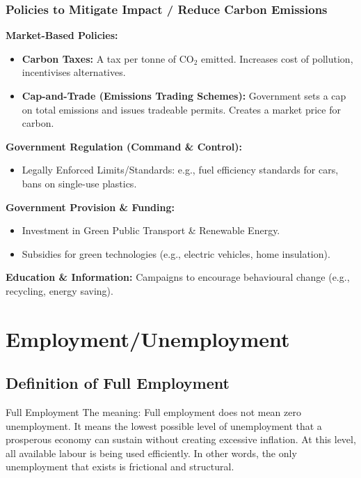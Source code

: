 \documentclass[11pt, a4paper, twoside]{book}
\begin{document}
\subsubsection{Policies to Mitigate Impact / Reduce Carbon Emissions}

\textbf{Market-Based Policies:}
\begin{itemize}
  \item \textbf{Carbon Taxes:} A tax per tonne of CO$_2$ emitted. Increases cost of pollution, incentivises alternatives.
  \item \textbf{Cap-and-Trade (Emissions Trading Schemes):} Government sets a cap on total emissions and issues tradeable permits. Creates a market price for carbon.
\end{itemize}

\textbf{Government Regulation (Command \& Control):}
\begin{itemize}
  \item Legally Enforced Limits/Standards: e.g., fuel efficiency standards for cars, bans on single-use plastics.
\end{itemize}

\textbf{Government Provision \& Funding:}
\begin{itemize}
  \item Investment in Green Public Transport \& Renewable Energy.
  \item Subsidies for green technologies (e.g., electric vehicles, home insulation).
\end{itemize}

\textbf{Education \& Information:} Campaigns to encourage behavioural change (e.g., recycling, energy saving).

\section{Employment/Unemployment}

\subsection{Definition of Full Employment}

\begin{keyterm}{Full Employment}
The meaning: Full employment does not mean zero unemployment. It means the lowest possible level of unemployment that a prosperous economy can sustain without creating excessive inflation. At this level, all available labour is being used efficiently. In other words, the only unemployment that exists is frictional and structural.
\end{keyterm}
\end{document}
